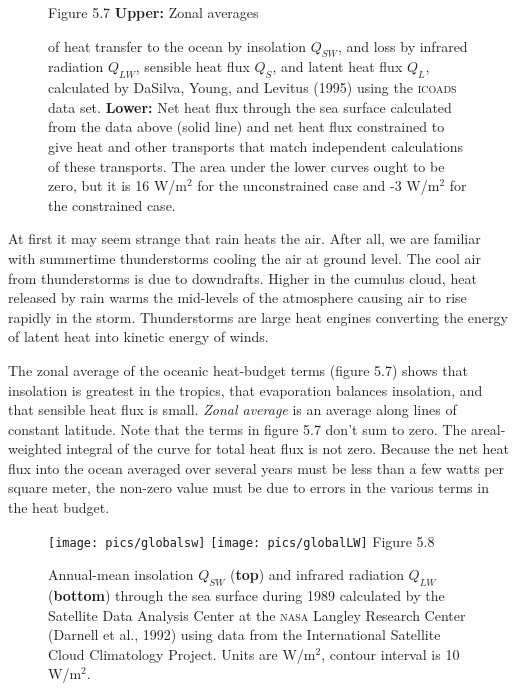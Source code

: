 \begin{figure}[b!]
\vspace{-2ex}
\footnotesize
Figure 5.7 \textbf{Upper:} Zonal averages \rule{0mm}{4ex}of heat
transfer to the ocean by insolation
$Q_{SW}$, and loss by infrared radiation $Q_{LW}$, sensible heat
flux $Q_S$, and latent heat
flux $Q_L$, calculated by DaSilva, Young, and Levitus (1995) using the
\textsc{icoads} data set.  \textbf{Lower:} Net heat flux through the
sea surface calculated from the data above (solid line) and net heat
flux constrained to give heat and other
transports that match independent calculations of these
transports. The area under the lower curves ought to be zero, but it
is 16 W/m$^2$ for the unconstrained case and -3 W/m$^2$ for the
constrained case.
\label{fig:zonalaveheat}
\end{figure}

At first it may seem strange that rain heats the air. After all, we
are familiar with summertime thunderstorms cooling the air at ground
level. The cool air from thunderstorms is due to downdrafts. Higher in
the cumulus cloud, heat released by rain warms the mid-levels of the
atmosphere causing air to rise rapidly in the storm. Thunderstorms are
large heat engines converting the energy of latent heat into kinetic
energy of winds.

The zonal average of the oceanic heat-budget terms (figure 5.7) shows
that insolation is greatest in the
tropics, that evaporation balances
insolation, and that
sensible heat flux is small.
\textit{Zonal average} is an
average along lines of constant latitude. Note that the terms in
figure 5.7 don't sum to zero. The areal-weighted integral of the curve
for total heat flux is not
zero. Because the net heat flux into
the ocean averaged over several years must be less than a few watts
per square meter, the non-zero value must be due to errors in the
various terms in the heat budget.

\begin{figure}[t!]
\texttt{[image: pics/globalsw]}
\texttt{[image: pics/globalLW]}
\footnotesize
Figure 5.8 \rule{0mm}{3ex}Annual-mean
insolation $Q_{SW}$ (\textbf{top})
and infrared radiation $Q_{LW}$ (\textbf{bottom}) through the sea
surface during 1989 calculated by the Satellite Data Analysis Center
at the \textsc{nasa} Langley Research Center (Darnell et al., 1992)
using data from the International Satellite Cloud Climatology
Project. Units are W/m$^2$, contour interval is 10 W/m$^2$.
\label{fig:globalSW}
\vspace{-4ex}
\end{figure}

